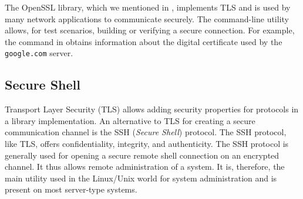The OpenSSL library, which we mentioned in , implements TLS and is used by many network applications to communicate securely.
The command-line utility  allows, for test scenarios, building or verifying a secure connection.
For example, the command in  obtains information about the digital certificate used by the \texttt{google.com} server.


\subsection{Secure Shell}
\label{sec:sec:transfer:ssh}

Transport Layer Security (TLS) allows adding security properties for protocols in a library implementation.
An alternative to TLS for creating a secure communication channel is the SSH (\textit{Secure Shell}) protocol.
The SSH protocol, like TLS, offers confidentiality, integrity, and authenticity.
The SSH protocol is generally used for opening a secure remote shell connection on an encrypted channel.
It thus allows remote administration of a system.
It is, therefore, the main utility used in the Linux/Unix world for system administration and is present on most server-type systems.

